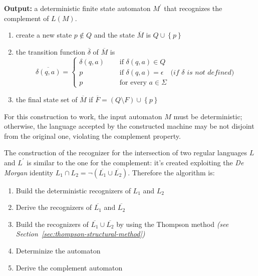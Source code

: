 \documentclass[english]{article}
\begin{document}
\textbf{Output:}
a deterministic finite state automaton \(M^\prime\) that recognizes the complement of \(L(M)\).

\begin{enumerate}
  \item create a new state \(p \notin Q\) and the state \(\overline{M}\) is \(Q \cup \left\{ p \right\}\)
  \item the transition function \(\overline{\delta}\) of \(\overline{M}\) is
        \[\overline{\delta(q, a)} = \begin{cases}
            \delta(q, a) \quad & \text{ if } \delta(q, a)\in Q                                                             \\
            p \quad           & \text{ if } \delta(q, a) = \epsilon \quad \textit{(if }  \delta \textit{ is not defined)} \\
            p \quad           & \text{ for every } a \in \Sigma
          \end{cases}\]
  \item the final state set of \(\overline{M}\) if \(\overline{F} = \left( Q \setminus F \right) \cup \left\{ p \right\}\)
\end{enumerate}

For this construction to work, the input automaton \(M\) must be deterministic;
otherwise, the language accepted by the constructed machine may be not disjoint from the original one, violating the complement property.

\bigskip
The construction of the recognizer for the intersection of two regular languages \(L\) and \(L^\prime\) is similar to the one for the complement:
it's created exploiting the \textit{De Morgan} identity \(L_1 \cap L_2 = \lnot (\overline{L_1} \cup \overline{L_2})\).
Therefore the algorithm is:

\begin{enumerate}
  \item Build the deterministic recognizers of \(L_1\) and \(L_2\)
  \item Derive the recognizers of \(\overline{L_1}\) and \(\overline{L_2}\)
  \item Build the recognizers of \(\overline{L_1} \cup \overline{L_2}\) by using the Thompson method \textit{(see Section~\ref{sec:thompson-structural-method})}
  \item Determinize the automaton
  \item Derive the complement automaton
\end{enumerate}
\end{document}
